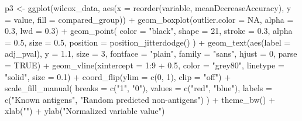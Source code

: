 \documentclass[
  11pt,
  oneside]{book}
\newenvironment{Shaded}{\begin{snugshade}}{\end{snugshade}}
\newcommand{\AttributeTok}[1]{\textcolor[rgb]{0.77,0.63,0.00}{#1}}
\newcommand{\ConstantTok}[1]{\textcolor[rgb]{0.00,0.00,0.00}{#1}}
\newcommand{\DecValTok}[1]{\textcolor[rgb]{0.00,0.00,0.81}{#1}}
\newcommand{\FloatTok}[1]{\textcolor[rgb]{0.00,0.00,0.81}{#1}}
\newcommand{\FunctionTok}[1]{\textcolor[rgb]{0.00,0.00,0.00}{#1}}
\newcommand{\NormalTok}[1]{#1}
\newcommand{\OtherTok}[1]{\textcolor[rgb]{0.56,0.35,0.01}{#1}}
\newcommand{\SpecialCharTok}[1]{\textcolor[rgb]{0.00,0.00,0.00}{#1}}
\newcommand{\StringTok}[1]{\textcolor[rgb]{0.31,0.60,0.02}{#1}}
\begin{document}
\begin{Shaded}
\begin{Highlighting}[]
\NormalTok{p3 }\OtherTok{\textless{}{-}} \FunctionTok{ggplot}\NormalTok{(wilcox\_data, }\FunctionTok{aes}\NormalTok{(}\AttributeTok{x =} \FunctionTok{reorder}\NormalTok{(variable, meanDecreaseAccuracy), }\AttributeTok{y =}\NormalTok{ value, }\AttributeTok{fill =}\NormalTok{ compared\_group)) }\SpecialCharTok{+}
  \FunctionTok{geom\_boxplot}\NormalTok{(}\AttributeTok{outlier.color =} \ConstantTok{NA}\NormalTok{, }\AttributeTok{alpha =} \FloatTok{0.3}\NormalTok{, }\AttributeTok{lwd =} \FloatTok{0.3}\NormalTok{) }\SpecialCharTok{+}
  \FunctionTok{geom\_point}\NormalTok{(}
    \AttributeTok{color =} \StringTok{"black"}\NormalTok{, }\AttributeTok{shape =} \DecValTok{21}\NormalTok{, }\AttributeTok{stroke =} \FloatTok{0.3}\NormalTok{, }\AttributeTok{alpha =} \FloatTok{0.5}\NormalTok{, }\AttributeTok{size =} \FloatTok{0.5}\NormalTok{,}
    \AttributeTok{position =} \FunctionTok{position\_jitterdodge}\NormalTok{()}
\NormalTok{  ) }\SpecialCharTok{+}
  \FunctionTok{geom\_text}\NormalTok{(}\FunctionTok{aes}\NormalTok{(}\AttributeTok{label =}\NormalTok{ adj\_pval), }\AttributeTok{y =} \FloatTok{1.1}\NormalTok{, }\AttributeTok{size =} \DecValTok{3}\NormalTok{, }\AttributeTok{fontface =} \StringTok{"plain"}\NormalTok{, }\AttributeTok{family =} \StringTok{"sans"}\NormalTok{, }\AttributeTok{hjust =} \DecValTok{0}\NormalTok{, }\AttributeTok{parse =} \ConstantTok{TRUE}\NormalTok{) }\SpecialCharTok{+}
  \FunctionTok{geom\_vline}\NormalTok{(}\AttributeTok{xintercept =} \DecValTok{1}\SpecialCharTok{:}\DecValTok{9} \SpecialCharTok{+} \FloatTok{0.5}\NormalTok{, }\AttributeTok{color =} \StringTok{"grey80"}\NormalTok{, }\AttributeTok{linetype =} \StringTok{"solid"}\NormalTok{, }\AttributeTok{size =} \FloatTok{0.1}\NormalTok{) }\SpecialCharTok{+}
  \FunctionTok{coord\_flip}\NormalTok{(}\AttributeTok{ylim =} \FunctionTok{c}\NormalTok{(}\DecValTok{0}\NormalTok{, }\DecValTok{1}\NormalTok{), }\AttributeTok{clip =} \StringTok{"off"}\NormalTok{) }\SpecialCharTok{+}
  \FunctionTok{scale\_fill\_manual}\NormalTok{(}
    \AttributeTok{breaks =} \FunctionTok{c}\NormalTok{(}\StringTok{"1"}\NormalTok{, }\StringTok{"0"}\NormalTok{), }\AttributeTok{values =} \FunctionTok{c}\NormalTok{(}\StringTok{"red"}\NormalTok{, }\StringTok{"blue"}\NormalTok{),}
    \AttributeTok{labels =} \FunctionTok{c}\NormalTok{(}\StringTok{"Known antigens"}\NormalTok{, }\StringTok{"Random predicted non{-}antigens"}\NormalTok{)}
\NormalTok{  ) }\SpecialCharTok{+}
  \FunctionTok{theme\_bw}\NormalTok{() }\SpecialCharTok{+}
  \FunctionTok{xlab}\NormalTok{(}\StringTok{""}\NormalTok{) }\SpecialCharTok{+}
  \FunctionTok{ylab}\NormalTok{(}\StringTok{"Normalized variable value"}\NormalTok{)}


\end{Highlighting}
\end{Shaded}
\end{document}
